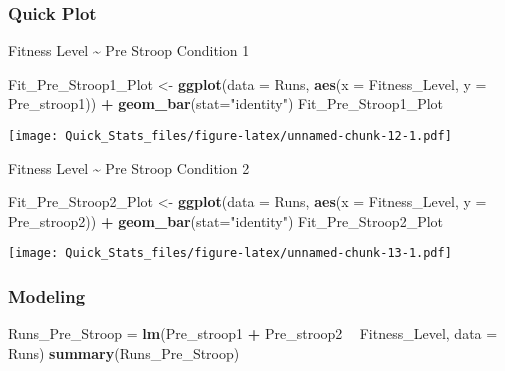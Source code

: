 \documentclass[]{article}
\newenvironment{Shaded}{\begin{snugshade}}{\end{snugshade}}
\newcommand{\KeywordTok}[1]{\textcolor[rgb]{0.13,0.29,0.53}{\textbf{#1}}}
\newcommand{\DataTypeTok}[1]{\textcolor[rgb]{0.13,0.29,0.53}{#1}}
\newcommand{\StringTok}[1]{\textcolor[rgb]{0.31,0.60,0.02}{#1}}
\newcommand{\OperatorTok}[1]{\textcolor[rgb]{0.81,0.36,0.00}{\textbf{#1}}}
\newcommand{\NormalTok}[1]{#1}
\begin{document}
\subsubsection{Quick Plot}\label{quick-plot-2}

Fitness Level \textasciitilde{} Pre Stroop Condition 1

\begin{Shaded}
\begin{Highlighting}[]
\NormalTok{Fit_Pre_Stroop1_Plot <-}\StringTok{ }\KeywordTok{ggplot}\NormalTok{(}\DataTypeTok{data =}\NormalTok{ Runs, }\KeywordTok{aes}\NormalTok{(}\DataTypeTok{x =}\NormalTok{ Fitness_Level, }\DataTypeTok{y =}\NormalTok{ Pre_stroop1)) }\OperatorTok{+}
\StringTok{  }\KeywordTok{geom_bar}\NormalTok{(}\DataTypeTok{stat=}\StringTok{"identity"}\NormalTok{)}
\NormalTok{Fit_Pre_Stroop1_Plot}
\end{Highlighting}
\end{Shaded}

\texttt{[image: Quick\_Stats\_files/figure-latex/unnamed-chunk-12-1.pdf]}

Fitness Level \textasciitilde{} Pre Stroop Condition 2

\begin{Shaded}
\begin{Highlighting}[]
\NormalTok{Fit_Pre_Stroop2_Plot <-}\StringTok{ }\KeywordTok{ggplot}\NormalTok{(}\DataTypeTok{data =}\NormalTok{ Runs, }\KeywordTok{aes}\NormalTok{(}\DataTypeTok{x =}\NormalTok{ Fitness_Level, }\DataTypeTok{y =}\NormalTok{ Pre_stroop2)) }\OperatorTok{+}
\StringTok{  }\KeywordTok{geom_bar}\NormalTok{(}\DataTypeTok{stat=}\StringTok{"identity"}\NormalTok{)}
\NormalTok{Fit_Pre_Stroop2_Plot}
\end{Highlighting}
\end{Shaded}

\texttt{[image: Quick\_Stats\_files/figure-latex/unnamed-chunk-13-1.pdf]}

\subsubsection{Modeling}\label{modeling-2}

\begin{Shaded}
\begin{Highlighting}[]
\NormalTok{Runs_Pre_Stroop =}\StringTok{ }\KeywordTok{lm}\NormalTok{(Pre_stroop1 }\OperatorTok{+}\StringTok{ }\NormalTok{Pre_stroop2 }\OperatorTok{~}\StringTok{ }\NormalTok{Fitness_Level, }\DataTypeTok{data =}\NormalTok{ Runs)}
\KeywordTok{summary}\NormalTok{(Runs_Pre_Stroop)}
\end{Highlighting}
\end{Shaded}
\end{document}

